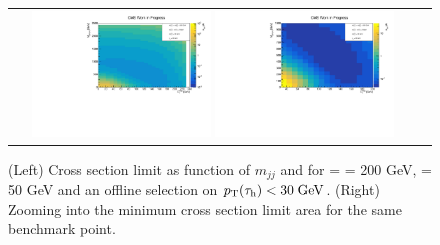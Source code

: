 \begin{figure}[tbh!]
	\centering
	\begin{tabular}{cc}
		\includegraphics[width=0.45\textwidth]{analysis/pics/JetInvMass_vs_MET_xsec_chi200_lsp050_taupt30.pdf}
		\includegraphics[width=0.45\textwidth]{analysis/pics/JetInvMass_vs_MET_xsec_chi200_lsp050_taupt30_zoom.pdf}
	\end{tabular}
	\caption{(Left) Cross section limit as function of $m_{jj}$ and \met for \charginopm = \neutralinotwo = 200 GeV, \neutralinoone = 50 GeV and an offline selection on $p_{\text{T}}(\tau_{\text{h}}) <  30\;\text{Ge}\kern-0.06667em\text{V}$. (Right) Zooming into the minimum cross section limit area for the same benchmark point.}
	\label{fig::JetInvMass_vs_MET_xsec_chi200_lsp050_taupt30}
\end{figure}

